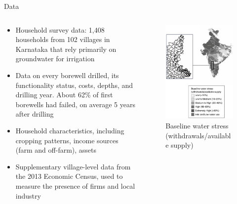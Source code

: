 \documentclass[10pt]{beamer}
\begin{document}
\begin{frame}
	{Data}
	\begin{columns}
		\begin{column}{0.7\textwidth}
			\begin{itemize}
				\item Household survey data: 1,408 households from 102 villages in Karnataka that rely primarily on groundwater for irrigation
				\item Data on every borewell drilled, its functionality status, costs, depths, and drilling year. About 62\% of first borewells had failed, on average 5 years after drilling
				\item Household characteristics, including cropping patterns, income sources (farm and off-farm), assets
				\item Supplementary village-level data from the 2013 Economic Census, used to measure the presence of firms and local industry
			\end{itemize}
		\end{column}
		\begin{column}{0.3\textwidth}
			\centering
			\begin{figure}
				\centering
				\includegraphics[width=1\textwidth]{figure1_left.png}
				\caption{Baseline water stress (withdrawals/available supply)}
			\end{figure}
		\end{column}
	\end{columns}
\end{frame}
\end{document}
